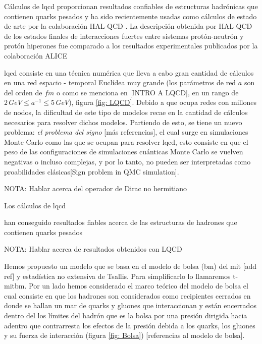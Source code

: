 
Cálculos de \acrshort{lqcd} proporcionan resultados confiables de estructuras hadrónicas que contienen quarks pesados y ha sido recientemente usadas como cálculos de estado de arte por la colaboración HAL-QCD \cite{Iritani_2019,Hatsuda_2017}. La descripción obtenida por HAL QCD de los estados finales de interacciones fuertes entre sistemas protón-neutrón y protón hiperones fue comparado a los resultados experimentales publicados por la colaboración ALICE \cite{Collaboration2020, Collaboration2021}

\acrshort{lqcd} consiste en una técnica numérica que lleva a cabo gran cantidad de cálculos en una red espacio - temporal Euclídea muy grande (los parámetros de red $a$ son del orden de $\mathit{fm}$ o como se menciona en [INTRO A LQCD], en un rango de $2 \, \mathit{GeV} \leq {a}^{-1} \leq 5 \, GeV$), figura \ref{fig: LQCD}. Debido a que ocupa redes con millones de nodos, la dificultad de este tipo de modelos recae en la cantidad de cálculos necesarios para resolver dichos modelos. 
Partiendo de esto, se tiene un nuevo problema: \emph{el problema del signo} [más referencias], el cual surge en simulaciones Monte Carlo como las que se ocupan para resolver \acrshort{lqcd}, esto consiste en que el peso de las configuraciones de simulaciones cuánticas Monte Carlo se vuelven negativas o incluso complejas, y por lo tanto, no pueden ser interpretadas como proabilidades clásicas[Sign problem in QMC simulation]. 

NOTA: Hablar acerca del operador de Dirac no hermitiano

Los cálculos de \acrshort{lqcd} 

han conseguido resultados fiables acerca de las estructuras de hadrones que contienen quarks pesados


NOTA: Hablar acerca de resultados obtenidos con LQCD

Hemos propuesto un modelo que se basa en el modelo de bolsa (\acrshort{bm}) del \acrfull{mit} [add ref] y estadística no extensiva de Tsallis. Para simplificarlo lo llamaremos \acrshort{t-mitbm}. Por un lado hemos considerado el marco teórico del modelo de bolsa el cual consiste en que los hadrones son considerados como recipientes cerrados en donde se hallan un mar de quarks y gluones que interaccionan y están encerrados dentro del los límites del hadrón que es la bolsa por una presión dirigida hacia adentro que contrarresta los efectos de la presión debida a los quarks, los gluones y su fuerza de interacción (figura \ref{fig: Bolsa}) [referencias al modelo de bolsa]. 

